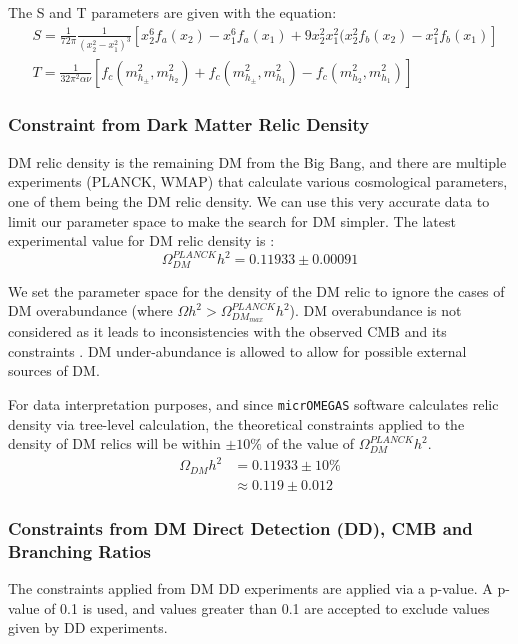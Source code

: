 \documentclass[12pt]{article}
\begin{document}
The S and T parameters are given with the equation:
\begin{align}
    &S = \frac{1}{72\pi}\frac{1}{(x^2_2 - x^2_1)^3}[x^6_2f_a(x_2)-x^6_1f_a(x_1) + 9x_2^2x_1^2(x_2^2f_b(x_2)-x^2_1f_b(x_1)] \label{eqn:S}
    \\
    &T = \frac{1}{32\pi^2\alpha\nu}[f_c(m^2_{h_\pm},m^2_{h_2}) + f_c(m^2_{h_\pm},m^2_{h_1}) - f_c(m^2_{h_2},m^2_{h_1})] \label{eqn:T}
\end{align}

\subsubsection{Constraint from Dark Matter Relic Density}
\label{sec:relic density}
DM relic density is the remaining DM from the Big Bang, and there are multiple experiments (PLANCK, WMAP) that calculate various cosmological parameters, one of them being the DM relic density. We can use this very accurate data to limit our parameter space to make the search for DM simpler. The latest experimental value for DM relic density is  \cite{Planck:2018vyg}:
\begin{equation}
    \Omega ^{PLANCK}_{DM} h^2 = 0.11933 \pm 0.00091
\end{equation}

We set the parameter space for the density of the DM relic to ignore the cases of DM overabundance (where $\Omega h^2 > \Omega^{PLANCK}_{DM_{max}}h^2$). DM overabundance is not considered as it leads to inconsistencies with the observed CMB and its constraints \cite{Croon_2024, Zavala_2010}. DM under-abundance is allowed to allow for possible external sources of DM.

For data interpretation purposes, and since \verb|micrOMEGAS| software calculates relic density via tree-level calculation, the theoretical constraints applied to the density of DM relics will be within $\pm10\%$ of the value of $\Omega ^{PLANCK}_{DM} h^2$.
\begin{equation}
    \begin{split}
        \Omega_{DM} h^2 &= 0.11933 \pm 10\% \\
        &\approx 0.119 \pm 0.012
    \end{split}
    \label{eqn:DM relic density value}
\end{equation}

\subsubsection{Constraints from DM Direct Detection (DD), CMB and Branching Ratios}
The constraints applied from DM DD experiments are applied via a p-value. A p-value of 0.1 is used, and values greater than 0.1 are accepted to exclude values given by DD experiments.
\end{document}
